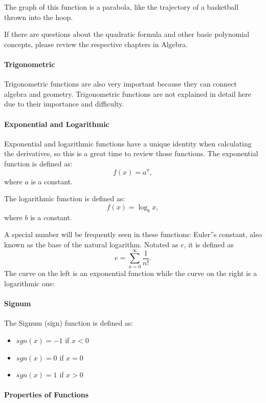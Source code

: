 The graph of this function is a parabola, like the trajectory of a basketball thrown into the hoop.


If there are questions about the quadratic formula and other basic polynomial concepts, please review the respective chapters in Algebra.

\paragraph{Trigonometric}

Trigonometric functions are also very important because they can connect algebra and geometry. Trigonometric functions are not explained in detail here due to their importance and difficulty.

\paragraph{Exponential and Logarithmic}

Exponential and logarithmic functions have a unique identity when calculating the derivatives, so this is a great time to review those functions. The exponential function is defined as:
$$
f(x) = a^x,
$$
where $a$ is a constant.

The logarithmic function is defined as:
$$
f(x) = \log_b x,
$$
where $b$ is a constant.

A special number will be frequently seen in these functions: Euler''s constant, also known as the base of the natural logarithm. Notated as $e$, it is defined as
$$
e = \sum_{n=0}^{\infty} \frac{1}{n!}.
$$
The curve on the left is an exponential function while the curve on the right is a logarithmic one:


\paragraph{Signum}

The Signum (sign) function is defined as:

\begin{itemize}
    \item \(sgn(x) = -1\) if \(x < 0\)
    \item \(sgn(x) = 0\) if \(x = 0\)
    \item \(sgn(x) = 1\) if \(x > 0\)
\end{itemize}

\paragraph{Properties of Functions}

